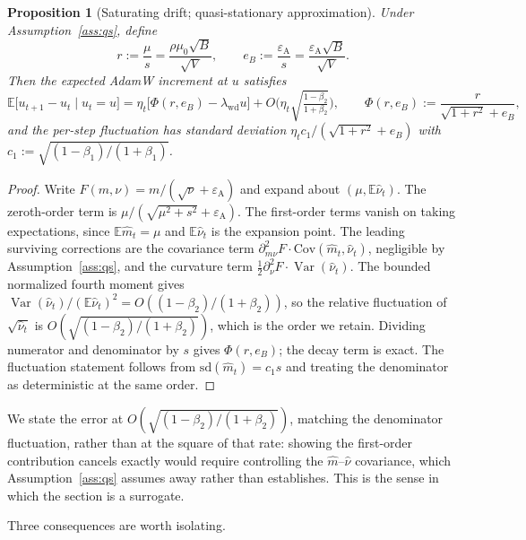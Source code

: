 \documentclass{article}
\theoremstyle{plain}
\newtheorem{proposition}{Proposition}
\theoremstyle{definition}
\theoremstyle{remark}
\newcommand{\E}{\mathbb{E}}
\newcommand{\Var}{\operatorname{Var}}
\newcommand{\1}{\mathbf{1}}
\newcommand{\wdc}{\mathrm{wd}}
\begin{document}
\begin{proposition}[Saturating drift; quasi-stationary approximation]
\label{prop:adamdrift}
Under Assumption~\ref{ass:qs}, define
\begin{equation}
\label{eq:rdef}
r := \frac{\mu}{s} = \frac{\rho\mu_0\sqrt B}{\sqrt V},
\qquad
e_B := \frac{\varepsilon_{\mathrm A}}{s} = \frac{\varepsilon_{\mathrm A}\sqrt B}{\sqrt V}.
\end{equation}
Then the expected AdamW increment at $u$ satisfies
\begin{equation}
\label{eq:adamphi}
\E\big[u_{t+1}-u_t \mid u_t = u\big]
= \eta_t\Big[\Phi(r,e_B) - \lambda_\wdc u\Big]
+ O\!\Big(\eta_t\sqrt{\tfrac{1-\beta_2}{1+\beta_2}}\Big),
\qquad
\Phi(r,e_B) := \frac{r}{\sqrt{1+r^2}+e_B},
\end{equation}
and the per-step fluctuation has standard deviation
$\eta_t c_1/(\sqrt{1+r^2}+e_B)$ with $c_1 := \sqrt{(1-\beta_1)/(1+\beta_1)}$.
\end{proposition}

\begin{proof}
Write $F(m,\nu) = m/(\sqrt\nu+\varepsilon_{\mathrm A})$ and expand about
$(\mu,\E\hat\nu_t)$. The zeroth-order term is
$\mu/(\sqrt{\mu^2+s^2}+\varepsilon_{\mathrm A})$. The first-order terms vanish on
taking expectations, since $\E\hat m_t = \mu$ and $\E\hat\nu_t$ is the expansion
point. The leading surviving corrections are the covariance term
$\partial^2_{m\nu}F\cdot\mathrm{Cov}(\hat m_t,\hat\nu_t)$, negligible by
Assumption~\ref{ass:qs}, and the curvature term
$\tfrac12\partial^2_{\nu}F\cdot\Var(\hat\nu_t)$. The bounded normalized fourth
moment gives $\Var(\hat\nu_t)/(\E\hat\nu_t)^2 = O((1-\beta_2)/(1+\beta_2))$, so
the relative fluctuation of $\sqrt{\hat\nu_t}$ is
$O(\sqrt{(1-\beta_2)/(1+\beta_2)})$, which is the order we retain. Dividing
numerator and denominator by $s$ gives $\Phi(r,e_B)$; the decay term is exact.
The fluctuation statement follows from $\mathrm{sd}(\hat m_t) = c_1s$ and
treating the denominator as deterministic at the same order.
\end{proof}

We state the error at $O(\sqrt{(1-\beta_2)/(1+\beta_2)})$, matching the
denominator fluctuation, rather than at the square of that rate: showing the
first-order contribution cancels exactly would require controlling the
$\hat m$--$\hat\nu$ covariance, which Assumption~\ref{ass:qs} assumes away rather
than establishes. This is the sense in which the section is a surrogate.

Three consequences are worth isolating.
\end{document}
